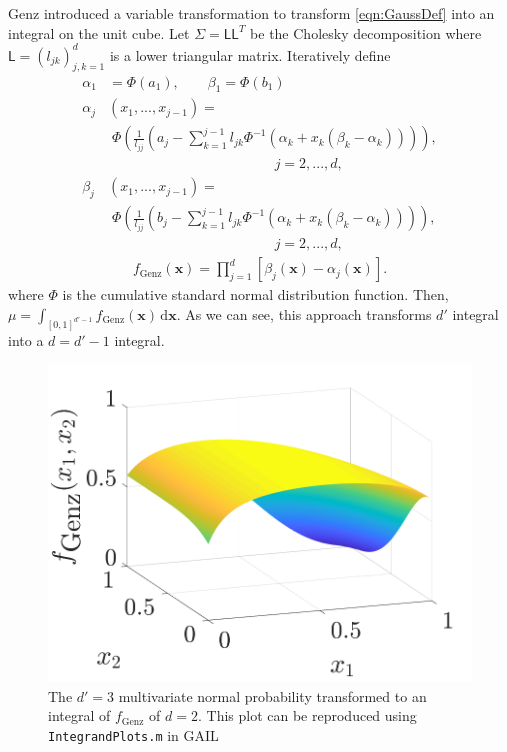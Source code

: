 \documentclass[twocolumn]{svjour3}          %
\newcommand{\bm}[1]{\boldsymbol{#1}}
\newcommand{\mSigma}{\mathsf{\Sigma}}
\newcommand{\dif}[1]{\text{d}{#1}}
\newcommand{\vx}{\bm{x}}
\newcommand{\dvx}{\dif{\bm{x}}}
\newcommand{\mL}{\mathsf{L}}
\newcommand{\code}[1]{\texttt{#1}}
\begin{document}
Genz \cite{Gen93} introduced a variable transformation to transform \eqref{eqn:GaussDef} into an integral on the unit cube.  Let $\mSigma= \mL \mL^T$ be the Cholesky decomposition where $\mL = (l_{jk})_{j,k=1}^d$ is a lower triangular matrix.  Iteratively define
\allowdisplaybreaks
\begin{align*}
\alpha_1& = \Phi(a_1), \qquad \beta_1 = \Phi(b_1)
\\
\alpha_j&(x_1,...,x_{j-1}) = 
\\
&\; \Phi
\left(
\frac{1}{l_{jj}} 
\left(
a_j - \sum_{k=1}^{j-1} l_{jk} \Phi^{-1}(\alpha_k + x_k(\beta_k-\alpha_k))
\right)
\right), 
\\
&\hspace{5cm} j=2,...,d,
\\
\beta_j&(x_1,...,x_{j-1}) = 
\\
&\; \Phi
\left(
\frac{1}{l_{jj}} 
\left(
b_j - \sum_{k=1}^{j-1} l_{jk} \Phi^{-1}(\alpha_k + x_k(\beta_k-\alpha_k))
\right)
\right), 
\\
&\hspace{5cm} j=2,...,d,
\end{align*}
\begin{align}
\label{fGenzdef}
f_{\text{Genz}}(\vx) = \prod_{j=1}^d [\beta_j(\vx) - \alpha_j(\vx)].
\end{align}
where $\Phi$ is the cumulative standard normal distribution function.  Then, $\mu = \int_{[0,1]^{d'-1}} f_{\text{Genz}}(\vx) \, \dvx$. As we can see, this approach transforms $d'$ integral into a $d=d'-1$ integral.

\begin{figure}
	\captionsetup[subfigure]{labelformat=empty}
	\centering
		\includegraphics[width=0.7\linewidth]{GenzFunc_varTx_none}
	\caption{The $d'=3$ multivariate normal probability transformed to an integral of $f_{\text{Genz}}$ of $d=2$. This plot can be reproduced using \code{IntegrandPlots.m} in GAIL}
	\label{fig:MVN_Genz}
\end{figure}
\end{document}
